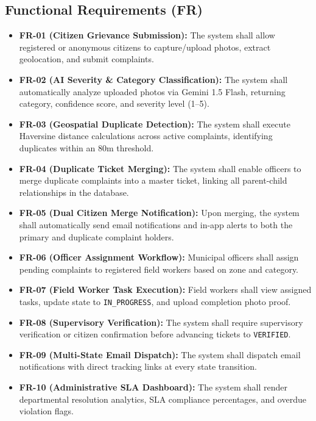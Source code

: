 \documentclass[11pt,a4paper]{article}
\begin{document}
\subsection{Functional Requirements (FR)}
\begin{itemize}[leftmargin=1.5em]
    \item \textbf{FR-01 (Citizen Grievance Submission):} The system shall allow registered or anonymous citizens to capture/upload photos, extract geolocation, and submit complaints.
    \item \textbf{FR-02 (AI Severity \& Category Classification):} The system shall automatically analyze uploaded photos via Gemini 1.5 Flash, returning category, confidence score, and severity level (1--5).
    \item \textbf{FR-03 (Geospatial Duplicate Detection):} The system shall execute Haversine distance calculations across active complaints, identifying duplicates within an 80m threshold.
    \item \textbf{FR-04 (Duplicate Ticket Merging):} The system shall enable officers to merge duplicate complaints into a master ticket, linking all parent-child relationships in the database.
    \item \textbf{FR-05 (Dual Citizen Merge Notification):} Upon merging, the system shall automatically send email notifications and in-app alerts to both the primary and duplicate complaint holders.
    \item \textbf{FR-06 (Officer Assignment Workflow):} Municipal officers shall assign pending complaints to registered field workers based on zone and category.
    \item \textbf{FR-07 (Field Worker Task Execution):} Field workers shall view assigned tasks, update state to \texttt{IN\_PROGRESS}, and upload completion photo proof.
    \item \textbf{FR-08 (Supervisory Verification):} The system shall require supervisory verification or citizen confirmation before advancing tickets to \texttt{VERIFIED}.
    \item \textbf{FR-09 (Multi-State Email Dispatch):} The system shall dispatch email notifications with direct tracking links at every state transition.
    \item \textbf{FR-10 (Administrative SLA Dashboard):} The system shall render departmental resolution analytics, SLA compliance percentages, and overdue violation flags.
\end{itemize}
\end{document}
